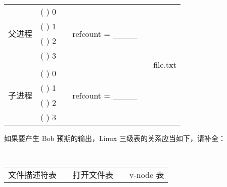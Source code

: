 \begin{problems}
\begin{table}[H]
\begin{tabular}{cccccc}
                \multicolumn{1}{|c|}{\multirow{4}{*}{父进程}} & \multicolumn{1}{c|}{(     ) 0} & \multicolumn{1}{c|}{} & \multicolumn{1}{c|}{\multirow{4}{*}{refcount = \_\_\_\_}} & \multicolumn{1}{c|}{} & \multicolumn{1}{c|}{\multirow{9}{*}{file.txt}} \\ \cline{2-2}
                \multicolumn{1}{|c|}{} & \multicolumn{1}{c|}{(     ) 1} & \multicolumn{1}{c|}{} & \multicolumn{1}{c|}{} & \multicolumn{1}{c|}{} & \multicolumn{1}{c|}{} \\ \cline{2-2}
                \multicolumn{1}{|c|}{} & \multicolumn{1}{c|}{(     ) 2} & \multicolumn{1}{c|}{} & \multicolumn{1}{c|}{} & \multicolumn{1}{c|}{} & \multicolumn{1}{c|}{} \\ \cline{2-2}
                \multicolumn{1}{|c|}{} & \multicolumn{1}{c|}{(     ) 3} & \multicolumn{1}{c|}{} & \multicolumn{1}{c|}{} & \multicolumn{1}{c|}{} & \multicolumn{1}{c|}{} \\ \cline{1-2} \cline{4-4}
                &  &  &  & \multicolumn{1}{c|}{} & \multicolumn{1}{c|}{} \\ \cline{1-2} \cline{4-4}
                \multicolumn{1}{|c|}{\multirow{4}{*}{子进程}} & \multicolumn{1}{c|}{(     ) 0} & \multicolumn{1}{c|}{} & \multicolumn{1}{c|}{\multirow{4}{*}{refcount = \_\_\_\_}} & \multicolumn{1}{c|}{} & \multicolumn{1}{c|}{} \\ \cline{2-2}
                \multicolumn{1}{|c|}{} & \multicolumn{1}{c|}{(     ) 1} & \multicolumn{1}{c|}{} & \multicolumn{1}{c|}{} & \multicolumn{1}{c|}{} & \multicolumn{1}{c|}{} \\ \cline{2-2}
                \multicolumn{1}{|c|}{} & \multicolumn{1}{c|}{(     ) 2} & \multicolumn{1}{c|}{} & \multicolumn{1}{c|}{} & \multicolumn{1}{c|}{} & \multicolumn{1}{c|}{} \\ \cline{2-2}
                \multicolumn{1}{|c|}{} & \multicolumn{1}{c|}{(     ) 3} & \multicolumn{1}{c|}{} & \multicolumn{1}{c|}{} & \multicolumn{1}{c|}{} & \multicolumn{1}{c|}{} \\ \cline{1-2} \cline{4-4} \cline{6-6} 
            \end{tabular}
        \end{table}
        \subqn 如果要产生 Bob 预期的输出，Linux 三级表的关系应当如下，请补全：
        \begin{table}[H]
            \tt
            \centering
            \begin{tabular}{cccccc}
                \multicolumn{2}{c}{文件描述符表} & {\qquad} & 打开文件表 & {\qquad} & v-node 表 \\ \cline{1-2} \cline{4-4} \cline{6-6} 

\end{tabular}
\end{table}
\end{problems}
